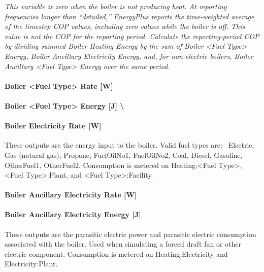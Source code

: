 \emph{This variable is zero when the boiler is not producing heat. At reporting frequencies longer than ``detailed,'' EnergyPlus reports the time-weighted average of the timestep COP values, including zero values while the boiler is off. This value is not the COP for the reporting period. Calculate the reporting-period COP by dividing summed Boiler Heating Energy by the sum of Boiler \textless{}Fuel Type\textgreater{} Energy, Boiler Ancillary Electricity Energy, and, for non-electric boilers, Boiler Ancillary \textless{}Fuel Type\textgreater{} Energy over the same period.}

\paragraph{Boiler \textless{}Fuel Type\textgreater{} Rate {[}W{]}}\label{boiler-fuel-type-rate-w}

\paragraph{Boiler \textless{}Fuel Type\textgreater{} Energy {[}J{]} \textbackslash{}}\label{boiler-fuel-type-energy-j}

\paragraph{Boiler Electricity Rate {[}W{]}}\label{boiler-electric-power-w}

These outputs are the energy input to the boiler. Valid fuel types are:~ Electric, Gas (natural gas), Propane, FuelOilNo1, FuelOilNo2, Coal, Diesel, Gasoline, OtherFuel1, OtherFuel2. Consumption is metered on Heating:\textless{}Fuel Type\textgreater{}, \textless{}Fuel Type\textgreater{}:Plant, and \textless{}Fuel Type\textgreater{}:Facility.

\paragraph{Boiler Ancillary Electricity Rate {[}W{]}}\label{boiler-ancillary-electric-power-w}

\paragraph{Boiler Ancillary Electricity Energy {[}J{]}}\label{boiler-ancillary-electric-energy-j}

These outputs are the parasitic electric power and parasitic electric consumption associated with the boiler. Used when simulating a forced draft fan or other electric component. Consumption is metered on Heating:Electricity and Electricity:Plant.

